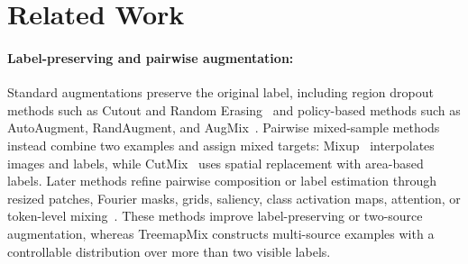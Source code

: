 \section{Related Work}

\paragraph{Label-preserving and pairwise augmentation:}
Standard augmentations preserve the original label, including region dropout
methods such as Cutout and Random Erasing~\citep{devries2017cutout,
zhong2020random} and policy-based methods such as AutoAugment, RandAugment,
and AugMix~\citep{cubuk2019autoaugment,
cubukRandAugmentPracticalAutomated2019,hendrycks2020augmix}. Pairwise
mixed-sample methods instead combine two examples and assign mixed targets:
Mixup~\citep{mixup} interpolates images and labels, while CutMix~\citep{cutmix}
uses spatial replacement with area-based labels. Later methods refine pairwise
composition or label estimation through resized patches, Fourier masks, grids,
saliency, class activation maps, attention, or token-level mixing~\citep{
qin2020resizemixmixingdatapreserved,harris2021fmixenhancingmixedsample,
baekGridMixStrongRegularization2021,kim2020puzzlemixexploitingsaliency,
huang2020snapmixsemanticallyproportionalmixing,
chen2021transmixattendmixvision,liu2023tokenmixrethinkingimagemixing}.
These methods improve label-preserving or two-source augmentation, whereas
TreemapMix constructs multi-source examples with a controllable distribution
over more than two visible labels.

